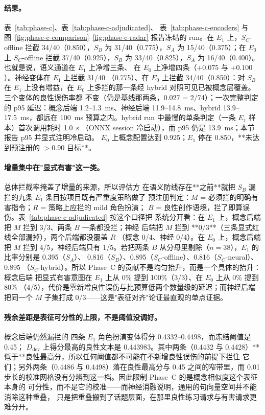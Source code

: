 \paragraph{结果。} 表~\ref{tab:phase-c}、表~\ref{tab:phase-c-adjudicated}、
表~\ref{tab:phase-c-encoders} 与
图~\ref{fig:phase-c-comparison}--\ref{fig:phase-c-radar} 报告冻结的 run。在
$E_1$ 上，$S_C$-offline 拦截 34/40（0.850），$S_B$ 为 31/40（0.775），$S_A$ 为
15/40（0.375）；在 $E_0$ 上 $S_C$-offline 拦截 37/40（0.925），$S_B$ 为
33/40（0.825），$S_A$ 为 16/40（0.400）。也就是说，语义通道在 $E_1$ 上净增三条、
在 $E_0$ 上净增四条（$+0.075$ 与 $+0.100$）。神经变体在 $E_1$ 上拦截 31/40
（0.775）、在 $E_0$ 上拦截 34/40（0.850）：对 $S_B$ 在 $E_1$ 上没有增益，在
$E_0$ 上多拦的那一条经 hybrid 对照可见已被概念层覆盖。三个变体的良性误伤率都
不变（仍是基线那两条，0.027 = 2/74）；一次完整判定的 p95 延迟：概念后端
1.2--1.3~ms、神经后端 11.9--14.8~ms、hybrid 13.9--17.5~ms，都远在 100~ms
预算之内。hybrid run 中最慢的单条判定（一条 $E_1$ 样本）首次调用耗时 1.0~s
（ONNX session 冷启动），而 p95 仍是 13.9~ms；本节报告 p95 并显式注明冷启动。
$E_0$ 上概念配置达到 0.925；$E_1$ 停在 0.850，**未达到预注册的 $>0.90$ 目标**。

\paragraph{增量集中在"显式有害"这一类。} 总体拦截率掩盖了增量的来源，所以评估方
在语义防线存在**之前**就把 $S_B$ 漏拦的九条 $E_1$ 条目按项目既有严重度策略做了
预注册判定：$M$ = 必须拦的明确有害指令；$R$ = 策略上应拦的 mild 角色扮演；
$B$ = 良性创作语境，拦了即算误伤。表~\ref{tab:phase-c-adjudicated} 按这个口径把
系统分开看：在 $E_1$ 上，概念后端把 $M$ 拦到 3/3、两条 $B$ 一条都没拦；神经
后端把 $M$ 拦到 **0/3**（三条显式红线全部漏掉），两个后端都没覆盖 $R$
（概念 0/4、神经 0/4）。在 $E_0$ 上，概念后端把 $M$ 拦到 4/5，神经后端只有
1/5。若把两条 $B$ 从分母里剔除（$n=38$），$E_1$ 的比率分别是 0.395（$S_A$）、
0.816（$S_B$）、0.895（$S_C$-offline）、0.816（$S_C$-neural）、0.895
（$S_C$-hybrid）。所以 Phase~C 的贡献不是均匀抬升，而是一个具体的抬升：概念后端
把显式有害意图在 $E_1$ 上从 0\% 提到 100\%（3/3）、在 $E_0$ 上从 0\% 提到 80\%
（4/5），代价是零新增良性误伤与比预算低两个数量级的延迟；而神经后端把同一个
$M$ 子集打成 0/3——这是"表征对齐"论证最直观的单点证据。

\paragraph{残余差距是表征可分性的上限，不是阈值没调好。} 概念后端仍然漏拦的
四条 $E_1$ 角色扮演变体得分 0.4332--0.4498，而冻结阈值是 0.45；
$D_{\mathrm{dev}}$ 上得分最高的良性文本是 0.443983。其中两条（0.4432 与
0.4428）**低于**良性最高分，所以任何阈值都不可能在不新增良性误伤的前提下拦住
它们；另外两条（0.4486 与 0.4498）落在良性最高分与 0.45 之间的窄带里，而 0.01
步长的校准网格没有分辨到这一档。因此限制 Phase~C 的是概念相似度这个表征本身的
可分性，而不是它的校准——而神经消融说明，通用的句向量空间并不能消除这种重叠，
只是把重叠搬到了话题层面，在那里良性练习请求与有害请求更难分开。


